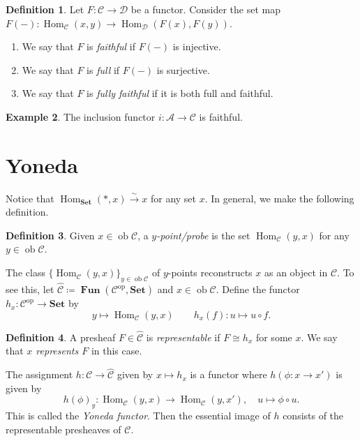 \documentclass[10pt,letterpaper,cm]{nupset}
\theoremstyle{definition}
\newtheorem{definition}{Definition}[subsection]
\newtheorem{exmp}[definition]{Example}
\theoremstyle{theorem}
\theoremstyle{remark}
\newcommand{\1}{\mathbf{1}}
\renewcommand{\a}{\mathscr{A}}
\renewcommand{\c}{\mathscr{C}}
\renewcommand{\d}{\mathscr{D}}
\newcommand{\0}{\vec 0}
\DeclareMathOperator{\op}{op}
\DeclareMathOperator{\ob}{ob}
\DeclareMathOperator{\Hom}{Hom}
\DeclareMathOperator{\Fun}{\mathbf{Fun}}
\begin{document}
\begin{definition} Let $F: \c \to \d$ be a functor. Consider the set map $F({-}): \Hom_{\c}(x,y) \to \Hom_{\d}(F(x), F(y))$.
\begin{enumerate}
\item We say that $F$ is \textit{faithful} if $F({-})$ is injective.
\item We say that $F$ is \textit{full} if $F({-})$ is surjective. 
\item We say that $F$ is \textit{fully faithful} if it is both full and faithful.
\end{enumerate}
\end{definition}

\begin{exmp}
The inclusion functor $i : \a \to \c$ is faithful.
\end{exmp}

\section{Yoneda}

Notice that $\Hom_{\mathbf{Set}}(\ast, x) \overset{\sim}{\longrightarrow} x$ for any set $x$. In general, we make the following definition.

\begin{definition}
Given $x \in \ob \c$, a \textit{$y$-point/probe} is the set $\Hom_{\c}(y, x)$ for any $y \in \ob \c$.
\end{definition}
The class $\{\Hom_{\c}(y, x)\}_{y\in \ob \c}$ of $y$-points reconstructs $x$ as an object in $\c$. To see this, let $\widehat{\c}\coloneqq  \Fun(\c^{\op}, \mathbf{Set})$ and $x \in \ob \c$. Define the functor $h_x : \c^{\op} \to \mathbf{Set}$ by $$y \mapsto \Hom_{\c}(y, x) \quad \quad h_x(f) : u \mapsto u \circ f.$$ 
\begin{definition}
A presheaf $F \in \widehat{\c}$ is \textit{representable} if $F \cong h_x$ for some $x$. We say that \textit{$x$ represents $F$} in this case.
\end{definition}
The assignment $h: \c \to \widehat{\c}$ given by $x \mapsto h_x$ is a functor where $h(\phi : x \to x')$ is given by $$h(\phi)_y : \Hom_{\c}(y, x) \to \Hom_{\c}(y, x'), \quad u \mapsto \phi \circ u.$$ This is called the \textit{Yoneda functor}. Then the essential image of $h$ consists of the representable presheaves of $\c$.
\end{document}
